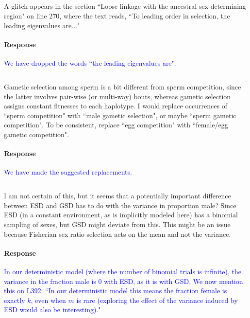 \documentclass[10pt,letterpaper]{article}
\begin{document}
\noindent\subsection{}
A glitch appears in the section ``Loose linkage with the ancestral sex-determining region" on line 270, where the text reads, ``To leading order in selection, the leading eigenvalues are..."

\noindent\paragraph{Response}
\textcolor{blue}{We have dropped the words ``the leading eigenvalues are".}

\noindent\subsection{}
Gametic selection among sperm is a bit different from sperm competition, since the latter involves pair-wise (or multi-way) bouts, whereas gametic selection assigns constant fitnesses to each haplotype. I would replace occurrences of ``sperm competition" with ``male gametic selection", or maybe ``sperm gametic competition". To be consistent, replace ``egg competition" with ``female/egg gametic competition". 

\noindent\paragraph{Response}
\textcolor{blue}{We have made the suggested replacements.
}

\noindent\subsection{}
I am not certain of this, but it seems that a potentially important difference between ESD and GSD has to do with the variance in proportion male? Since ESD (in a constant environment, as is implicitly modeled here) has a binomial sampling of sexes, but GSD might deviate from this.  This might be an issue because Fisherian sex ratio selection acts on the mean and not the variance.

\noindent\paragraph{Response}
\textcolor{blue}{In our deterministic model (where the number of binomial trials is infinite), the variance in the fraction male is 0 with ESD, as it is with GSD. 
We now mention this on L392: ``In our deterministic model this means the fraction female is exactly $k$, even when $m$ is rare (exploring the effect of the variance induced by ESD would also be interesting)."
 }
\end{document}
